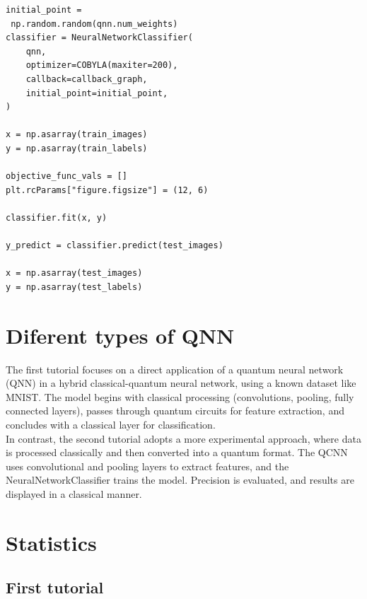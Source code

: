 \documentclass[conference]{IEEEtran}
\begin{document}
\begin{itemize}
    
{\small
\begin{verbatim}
initial_point =
 np.random.random(qnn.num_weights)
classifier = NeuralNetworkClassifier(
    qnn,
    optimizer=COBYLA(maxiter=200),
    callback=callback_graph,
    initial_point=initial_point,
)

x = np.asarray(train_images)
y = np.asarray(train_labels)

objective_func_vals = []
plt.rcParams["figure.figsize"] = (12, 6)

classifier.fit(x, y)

y_predict = classifier.predict(test_images)

x = np.asarray(test_images)
y = np.asarray(test_labels)

\end{verbatim}}
\end{itemize}


\section*{\fontsize{16}{20}\selectfont Diferent types of QNN}

The first tutorial focuses on a direct application of a quantum neural network (QNN) in a hybrid classical-quantum neural network, 
using a known dataset like MNIST. The model begins with classical processing (convolutions, pooling, fully connected layers), 
passes through quantum circuits for feature extraction, and concludes with a classical layer for classification. \\

In contrast, 
the second tutorial adopts a more experimental approach, where data is processed classically and then converted into a quantum format. 
The QCNN uses convolutional and pooling layers to extract features, and the NeuralNetworkClassifier trains the model. 
Precision is evaluated, and results are displayed in a classical manner. 

\section*{\fontsize{16}{20}\selectfont Statistics}

\subsection*{\fontsize{12}{16}\selectfont First tutorial}
\end{document}
